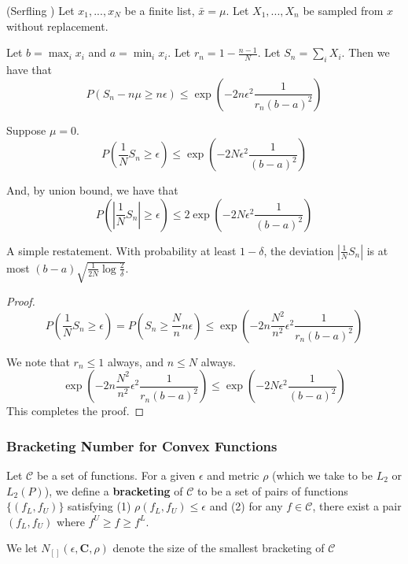 \begin{lemma} (Serfling \cite{serfling1974probability}) 
Let $x_1,..., x_N$ be a finite list, $\bar{x} = \mu$. Let $X_1,...,X_n$ be sampled from $x$ without replacement. 

Let $b = \max_i x_i$ and $a = \min_i x_i$. Let $r_n = 1- \frac{n-1}{N}$. Let $S_n = \sum_i X_i$.
Then we have that
\[
P( S_n - n \mu \geq n \epsilon) \leq \exp( - 2 n \epsilon^2 \frac{1}{r_n (b-a)^2})
\]
\end{lemma}

\begin{corollary}
\label{cor:serfling}
Suppose $\mu = 0$. 
\[
P( \frac{1}{N} S_n \geq \epsilon) \leq \exp( -2 N \epsilon^2 \frac{1}{(b-a)^2})
\]

And, by union bound, we have that
\[
P( | \frac{1}{N} S_n| \geq \epsilon) \leq 2 \exp( -2 N \epsilon^2 \frac{1}{(b-a)^2})
\]

\end{corollary}

A simple restatement. With probability at least $1- \delta$, the deviation $| \frac{1}{N} S_n|$ is at most $ (b-a) \sqrt{ \frac{1}{2N} \log \frac{2}{\delta}}$.

\begin{proof}
\[
P( \frac{1}{N} S_n \geq \epsilon) = P( S_n \geq \frac{N}{n} n \epsilon) \leq \exp( - 2 n \frac{N^2}{n^2} \epsilon^2 \frac{1}{r_n (b-a)^2} ) 
\]

We note that $r_n \leq 1$ always, and $n \leq N$ always. 
\[
\exp( - 2 n \frac{N^2}{n^2} \epsilon^2 \frac{1}{r_n (b-a)^2} )  \leq \exp( - 2 N \epsilon^2 \frac{1}{(b-a)^2})
\]
This completes the proof.

\end{proof}

\subsubsection{Bracketing Number for Convex Functions}

\begin{definition}
Let $\mathcal{C}$ be a set of functions. For a given $\epsilon$ and metric $\rho$ (which we take to be $L_2$ or $L_2(P)$), we define a \textbf{bracketing} of $\mathcal{C}$ to be a set of pairs of functions $\{ (f_L, f_U) \}$ satisfying (1) $\rho( f_L, f_U) \leq \epsilon$ and (2) for any $f \in \mathcal{C}$, there exist a pair $(f_L, f_U)$ where $f^U \geq f \geq f^L$. 

We let $N_{[]}(\epsilon, \mathbf{C}, \rho)$ denote the size of the smallest bracketing of $\mathcal{C}$
\end{definition}

